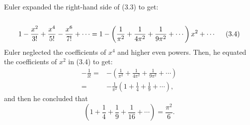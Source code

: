 \documentclass[a4paper,reqno,11pt]{book}
\theoremstyle{plain}%
\theoremstyle{definition}
\begin{document}
Euler expanded the right-hand side of (3.3) to get:\\
\\
$$1 - \frac{x^2}{3!} + \frac{x^4}{5!} - \frac{x^6}{7!} + \cdots = 1 - \left(\frac{1}{\pi^2} + \frac{1}{4\pi^2} + \frac{1}{9\pi^2} + \cdots \right)x^2 + \cdots \hspace{0.5cm} (3.4) $$
Euler neglected the coefficients of $x^4$ and higher even powers. Then, he equated the coefficients of $x^2$ in (3.4) to get:
\begin{align*}
-\frac{1}{3!} =& -\left(\frac{1}{\pi^2} + \frac{1}{4\pi^2} + \frac{1}{9\pi^2} + \cdots \right)\\
=& -\frac{1}{\pi^2}\left(1 + \frac{1}{4} + \frac{1}{9} + \cdots \right),
\end{align*}
and then he concluded that
$$\left(1 + \frac{1}{4} + \frac{1}{9} + \frac{1}{16} + \cdots \right) = \frac{\pi^2}{6}.$$
\end{document}
